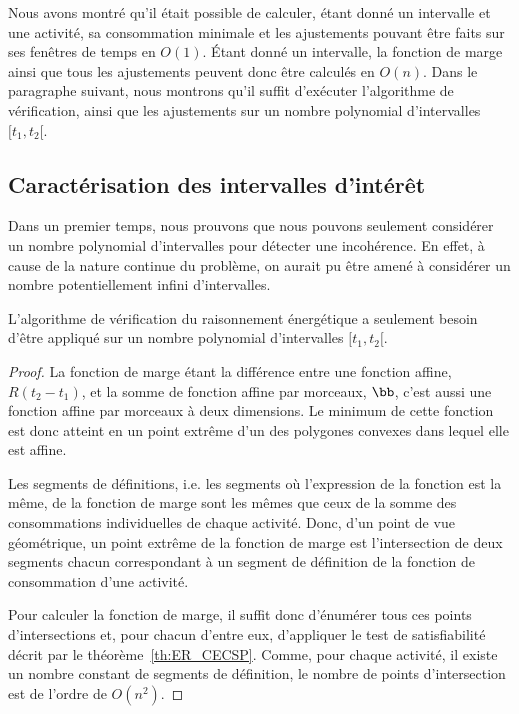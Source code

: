 Nous avons montré qu'il était possible de calculer, étant donné un
intervalle et une activité, sa consommation minimale et les
ajustements pouvant être faits sur ses fenêtres de temps en
$O(1)$. {\'E}tant donné un intervalle, la fonction de marge ainsi que
tous les ajustements peuvent donc être calculés en $O(n)$. Dans le
paragraphe suivant, nous montrons qu'il suffit d'exécuter l'algorithme
de vérification, ainsi que les ajustements sur un nombre polynomial
d'intervalles $[t_1,t_2[$.

\subsection{Caractérisation des intervalles d'intérêt}
\label{sec:intervalle_CECSP}
Dans un premier temps, nous prouvons que nous pouvons seulement
considérer un nombre polynomial d'intervalles pour détecter une
incohérence. En effet, à cause de la nature continue du problème, on
aurait pu être amené à considérer un nombre potentiellement infini
d'intervalles. 

\begin{theo}
  L'algorithme de vérification du raisonnement énergétique a seulement
  besoin d'être appliqué sur un nombre polynomial d'intervalles $[t_1,t_2[$.
\end{theo}

\begin{proof}
  La fonction de marge étant la différence entre une fonction affine,
  $R(t_2-t_1)$, et la somme de fonction affine par morceaux,
  $\bb$, c'est aussi une fonction affine par morceaux à deux
  dimensions. Le minimum de cette fonction est donc atteint en un point
  extrême d'un des polygones convexes dans lequel elle est
  affine. 

  Les segments de définitions, i.e. les segments où l'expression de la
  fonction est la même, de la fonction de marge sont les mêmes que ceux
  de la somme des consommations individuelles de chaque activité. Donc,
  d'un point de vue géométrique, un point extrême de la fonction de marge
  est l'intersection de deux segments chacun correspondant à un segment
  de définition de la fonction de consommation d'une activité. 

  Pour calculer la fonction de marge, il suffit donc d'énumérer tous
  ces points d'intersections et, pour chacun d'entre eux, d'appliquer le
  test de satisfiabilité décrit par le
  théorème~\ref{th:ER_CECSP}. Comme, pour chaque activité, il existe un
  nombre constant de segments de définition, le nombre de points
  d'intersection est de l'ordre de $O(n^2)$.
\end{proof}

